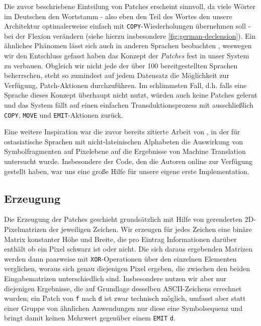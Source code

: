 \documentclass[11pt,a4paper]{article}
\newcommand{\action}[1]{\texttt{#1}}
\begin{document}
Die zuvor beschriebene Einteilung von Patches erscheint sinnvoll, da viele Wörter im Deutschen den Wortstamm - also eben den Teil des Wortes den unsere Architektur optimalerweise einfach mit \action{COPY}-Wiederholungen übernehmen soll - bei der Flexion verändern (siehe hierzu insbesondere \autoref{fig:german-declension}).
Ein ähnliches Phänomen lässt sich auch in anderen Sprachen beobachten \citep{kendris:cedilla2001, wiese:umlaut2009}, weswegen wir den Entschluss gefasst haben das Konzept der \textit{Patches} fest in unser System zu verbauen. Obgleich wir nicht jede der über 100 bereitgestellten Sprachen beherrschen, steht so zumindest auf jedem Datensatz die Möglichkeit zur Verfügung, Patch-Aktionen durchzuführen. Im schlimmsten Fall, d.h. falls eine Sprache dieses Konzept überhaupt nicht nutzt, würden auch keine Patches gelernt und das System fällt auf einen einfachen Transduktionsprozess mit ausschließlich \action{COPY}, \action{MOVE} und \action{EMIT}-Aktionen zurück.

Eine weitere Inspiration war die zuvor bereits zitierte Arbeit von \citet{cjk-mt:LiuLLN17}, in der für ostasiatische Sprachen mit nicht-lateinischen Alphabeten die Auswirkung von Symbolfragmenten auf Pixelebene auf die Ergebnisse von Machine Translation untersucht wurde.
Insbesondere der Code, den die Autoren online zur Verfügung gestellt haben, war uns eine große Hilfe für unsere eigene erste Implementation.

\subsection{Erzeugung}
Die Erzeugung der Patches geschieht grundsätzlich mit Hilfe von gerenderten 2D-Pixelmatrizen der jeweiligen Zeichen. Wir erzeugen für jedes Zeichen eine binäre Matrix konstanter Höhe und Breite, die pro Eintrag Informationen darüber enthält ob ein Pixel schwarz ist oder nicht.
Die sich daraus ergebenden Matrizen werden dann paarweise mit \texttt{XOR}-Operationen über den einzelnen Elementen verglichen, woraus sich genau diejenigen Pixel ergeben, die zwischen den beiden Eingabematrizen unterschiedlich sind. Insbesondere nutzen wir aber nur diejenigen Ergebnisse, die auf Grundlage desselben ASCII-Zeichens errechnet wurden; ein Patch von \texttt{f} nach \texttt{d} ist zwar technisch möglich, umfasst aber statt einer Gruppe von ähnlichen Anwendungen nur diese eine Symbolsequenz und bringt damit keinen Mehrwert gegenüber einem \action{EMIT} \texttt{d}.
\end{document}
